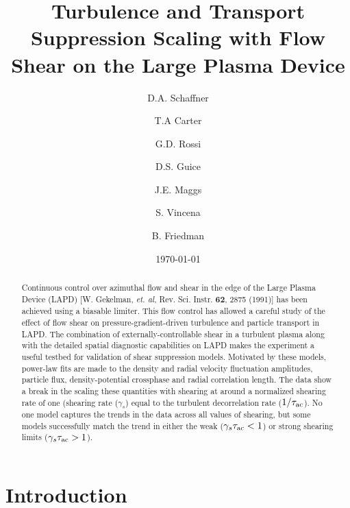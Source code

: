 \documentclass[aip,pop,amsmath,amssymb,preprint,superscriptaddress]{revtex4-1} %
\begin{document}
\title{Turbulence and Transport Suppression Scaling with Flow Shear on the Large Plasma Device}
\author{D.A. Schaffner}
\author{T.A Carter}
\author{G.D. Rossi}
\author{D.S. Guice}
\author{J.E. Maggs}
\author{S. Vincena}
\author{B. Friedman}
\date{\today}
\begin{abstract}
Continuous control over azimuthal flow and shear in the edge of the Large Plasma Device (LAPD) [W. Gekelman, \textit{et. al}, Rev. Sci. Instr. \textbf{62}, 2875 (1991)] has been achieved using a biasable limiter.  This flow control has allowed a careful study of the effect of flow shear on pressure-gradient-driven turbulence and particle transport in LAPD. The combination of externally-controllable shear in a turbulent plasma along with the detailed spatial diagnostic capabilities on LAPD makes the experiment a useful testbed for validation of shear suppression models. Motivated by these models, power-law fits are made to the density and radial velocity fluctuation amplitudes, particle flux, density-potential crossphase and radial correlation length.  The data show a break in the scaling these quantities with shearing at around a normalized shearing rate of one (shearing rate ($\gamma_s$) equal to the turbulent decorrelation rate ($1/\tau_{\rm ac}$).  No one model captures the trends in the data across all values of shearing, but some models successfully match the trend in either the weak  ($\gamma_s \tau_{\rm ac} < 1$) or strong shearing limits ($\gamma_s \tau_{\rm ac} > 1$). 
\end{abstract}
\maketitle

\section{Introduction}
\end{document}
